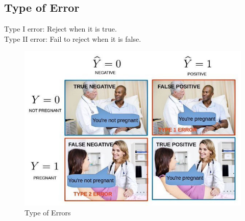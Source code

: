 \documentclass[../main.tex]{subfiles}
\begin{document}
\subsection*{Type of Error}
Type I error: Reject \hn when it is true.\\
Type II error: Fail to reject \hn when it is false.
\begin{figure}[bh]
\centering
\includegraphics[width=15cm]{Sections/Image/TypeError.jpeg}
\caption{Type of Errors}
\end{figure}
\end{document}
